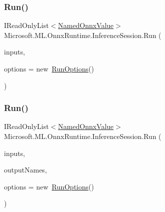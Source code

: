 \subsubsection{\texorpdfstring{Run()}{Run()}\hspace{0.1cm}{\footnotesize\ttfamily [1/2]}}
{\footnotesize\ttfamily I\+Read\+Only\+List$<$\mbox{\hyperlink{classMicrosoft_1_1ML_1_1OnnxRuntime_1_1NamedOnnxValue}{Named\+Onnx\+Value}}$>$ Microsoft.\+M\+L.\+Onnx\+Runtime.\+Inference\+Session.\+Run (\begin{DoxyParamCaption}\item[{I\+Read\+Only\+List$<$ \mbox{\hyperlink{classMicrosoft_1_1ML_1_1OnnxRuntime_1_1NamedOnnxValue}{Named\+Onnx\+Value}} $>$}]{inputs,  }\item[{\mbox{\hyperlink{structMicrosoft_1_1ML_1_1OnnxRuntime_1_1RunOptions}{Run\+Options}}}]{options = {\ttfamily new~\mbox{\hyperlink{structMicrosoft_1_1ML_1_1OnnxRuntime_1_1RunOptions}{Run\+Options}}()} }\end{DoxyParamCaption})\hspace{0.3cm}{\ttfamily [inline]}}

\mbox{\label{classMicrosoft_1_1ML_1_1OnnxRuntime_1_1InferenceSession_a056db8b6717c41e7fa63fe1e5823ac96}} 
\subsubsection{\texorpdfstring{Run()}{Run()}\hspace{0.1cm}{\footnotesize\ttfamily [2/2]}}
{\footnotesize\ttfamily I\+Read\+Only\+List$<$\mbox{\hyperlink{classMicrosoft_1_1ML_1_1OnnxRuntime_1_1NamedOnnxValue}{Named\+Onnx\+Value}}$>$ Microsoft.\+M\+L.\+Onnx\+Runtime.\+Inference\+Session.\+Run (\begin{DoxyParamCaption}\item[{I\+Read\+Only\+List$<$ \mbox{\hyperlink{classMicrosoft_1_1ML_1_1OnnxRuntime_1_1NamedOnnxValue}{Named\+Onnx\+Value}} $>$}]{inputs,  }\item[{I\+Collection$<$ string $>$}]{output\+Names,  }\item[{\mbox{\hyperlink{structMicrosoft_1_1ML_1_1OnnxRuntime_1_1RunOptions}{Run\+Options}}}]{options = {\ttfamily new~\mbox{\hyperlink{structMicrosoft_1_1ML_1_1OnnxRuntime_1_1RunOptions}{Run\+Options}}()} }\end{DoxyParamCaption})\hspace{0.3cm}{\ttfamily [inline]}}



